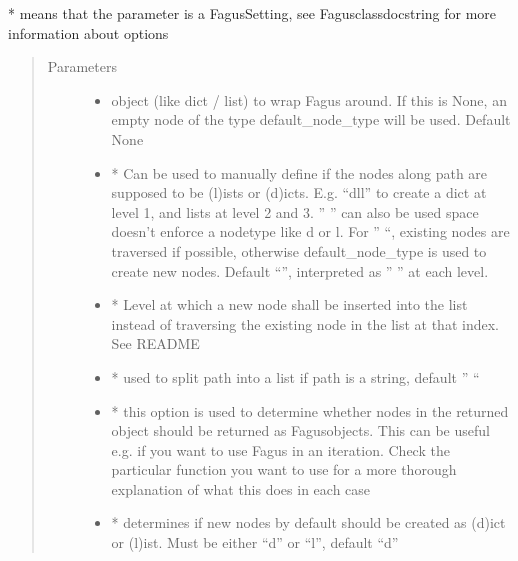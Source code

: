 \documentclass[a4paper,10pt,english]{sphinxmanual}
\begin{document}
\begin{fulllineitems}
\begin{fulllineitems}
\sphinxAtStartPar
* means that the parameter is a Fagus\sphinxhyphen{}Setting, see Fagus\sphinxhyphen{}class\sphinxhyphen{}docstring for more information about options
\begin{quote}\begin{description}
\item[{Parameters}] \leavevmode\begin{itemize}
\item {}
\sphinxAtStartPar
{} \textendash{} object (like dict / list) to wrap Fagus around. If this is None, an empty node of the type
default\_node\_type will be used. Default None

\item {}
\sphinxAtStartPar
{} \textendash{} * Can be used to manually define if the nodes along path are supposed to be (l)ists or
(d)icts. E.g. “dll” to create a dict at level 1, and lists at level 2 and 3. ” ” can also be used \sphinxhyphen{}
space doesn’t enforce a node\sphinxhyphen{}type like d or l. For ” “, existing nodes are traversed if possible,
otherwise default\_node\_type is used to create new nodes. Default “”, interpreted as ” ” at each level.

\item {}
\sphinxAtStartPar
{} \textendash{} * Level at which a new node shall be inserted into the list instead of traversing the
existing node in the list at that index. See README

\item {}
\sphinxAtStartPar
{} \textendash{} * used to split path into a list if path is a string, default ” “

\item {}
\sphinxAtStartPar
{} \textendash{} * this option is used to determine whether nodes in the returned object should be returned as
Fagus\sphinxhyphen{}objects. This can be useful e.g. if you want to use Fagus in an iteration. Check the particular
function you want to use for a more thorough explanation of what this does in each case

\item {}
\sphinxAtStartPar
{} \textendash{} * determines if new nodes by default should be created as (d)ict or (l)ist. Must be
either “d” or “l”, default “d”


\end{itemize}
\end{description}
\end{quote}
\end{fulllineitems}
\end{fulllineitems}
\end{document}
